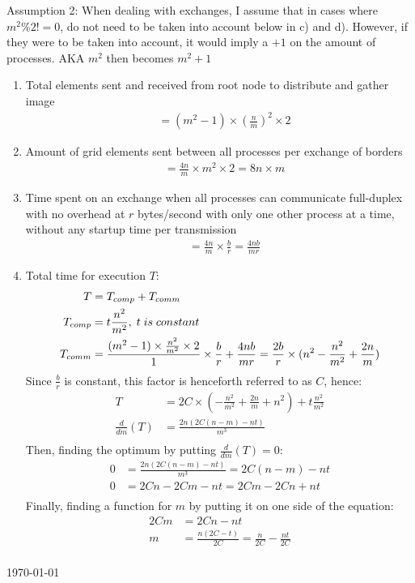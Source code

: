 \documentclass[fontsize=11pt, paper=a4, titlepage]{article}
\begin{document}
Assumption 2: When dealing with exchanges, I assume that in cases where $m^2 \%
2 != 0$, do not need to be taken into account below in c) and d). However, if
they were to be taken into account, it would imply a $+1$ on the amount of
processes. AKA $m^2$ then becomes $m^2 +1$

\begin{enumerate}

    \item Total elements sent and received from root node to distribute and gather image
    \begin{align*}
        &= (m^2 - 1)\times (\frac{n}{m})^2\times 2
    \end{align*}

    \item Amount of grid elements sent between all processes per exchange of borders
    \begin{align*}
        &= \frac{4n}{m}\times m^2\times 2 = 8n\times m
    \end{align*}

    \item Time spent on an exchange when all processes can communicate full-duplex
with no overhead at $r$ bytes/second with only one other process at a time, without any startup time per transmission
    \begin{align*}
        &= \frac{4n}{m}\times \frac{b}{r} = \frac{4nb}{mr}
    \end{align*}

    \item Total time for execution $T$:
    \begin{align*}
        T &= T_{comp} + T_{comm} \\
        T_{comp} &= t \frac{n^2}{m^2},\thickspace t\thickspace is\thickspace constant \\
        T_{comm} &= \frac{(m^2 -1)\times \frac{n^2}{m^2}\times 2}{1}\times \frac{b}{r} +  \frac{4nb}{mr} = \frac{2b}{r}\times (n^2 - \frac{n^2}{m^2} + \frac{2n}{m})
    \end{align*}
    Since $\frac{b}{r}$ is constant, this factor is henceforth referred to as $C$, hence:
    \begin{align*}
        T &= 2C \times (-\frac{n^2}{m^2} + \frac{2n}{m} + n^2) + t\frac{n^2}{m^2} \\
        \frac{d}{dm}(T) &= \frac{2n(2C(n-m) - nt)}{m^3} \\
    \end{align*}
    Then, finding the optimum by putting $\frac{d}{dm}(T) = 0$:
    \begin{align*}
        0 &= \frac{2n(2C(n-m) - nt)}{m^3} = 2C(n-m) - nt \\
        0 &= 2Cn -2Cm - nt = 2Cm - 2Cn + nt \\
    \end{align*}
    Finally, finding a function for $m$ by putting it on one side of the equation:
    \begin{align*}
        2Cm &= 2Cn - nt \\
        m &= \frac{n(2C - t)}{2C} = \frac{n}{2C} - \frac{nt}{2C} \\
    \end{align*}

\end{enumerate}

\vfill
\large{\today}
\end{document}
